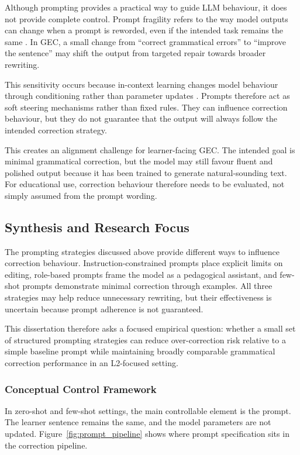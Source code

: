 Although prompting provides a practical way to guide LLM behaviour, it does not provide complete control. Prompt fragility refers to the way model outputs can change when a prompt is reworded, even if the intended task remains the same \cite{liu2023pretrain}. In GEC, a small change from ``correct grammatical errors'' to ``improve the sentence'' may shift the output from targeted repair towards broader rewriting.

This sensitivity occurs because in-context learning changes model behaviour through conditioning rather than parameter updates \cite{NEURIPS2020_1457c0d6}. Prompts therefore act as soft steering mechanisms rather than fixed rules. They can influence correction behaviour, but they do not guarantee that the output will always follow the intended correction strategy.

This creates an alignment challenge for learner-facing GEC. The intended goal is minimal grammatical correction, but the model may still favour fluent and polished output because it has been trained to generate natural-sounding text. For educational use, correction behaviour therefore needs to be evaluated, not simply assumed from the prompt wording.

\subsection{Synthesis and Research Focus}

The prompting strategies discussed above provide different ways to influence correction behaviour. Instruction-constrained prompts place explicit limits on editing, role-based prompts frame the model as a pedagogical assistant, and few-shot prompts demonstrate minimal correction through examples. All three strategies may help reduce unnecessary rewriting, but their effectiveness is uncertain because prompt adherence is not guaranteed.

This dissertation therefore asks a focused empirical question: whether a small set of structured prompting strategies can reduce over-correction risk relative to a simple baseline prompt while maintaining broadly comparable grammatical correction performance in an L2-focused setting.

\subsubsection*{Conceptual Control Framework}

In zero-shot and few-shot settings, the main controllable element is the prompt. The learner sentence remains the same, and the model parameters are not updated. Figure~\ref{fig:prompt_pipeline} shows where prompt specification sits in the correction pipeline.

